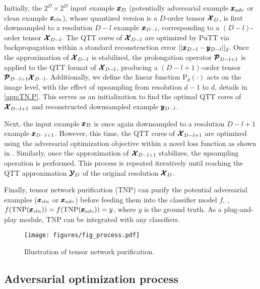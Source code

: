 Initially, the $2^D \times 2^D$ input example $\pmb{x}_D$ (potentially adversarial example $\pmb{x}_{adv}$ or clean example $\pmb{x}_{cln}$),
whose quantized version is a $D$-order tensor $\pmb{\mathcal{X}}_{D}$, is first downsampled to a resolution $D-l$ example
$\pmb{x}_{D-l}$,
corresponding to a $(D-l)$-order tensor $\pmb{\mathcal{X}}_{D-l}$.
The QTT cores of $\pmb{\mathcal{X}}_{D-l}$ are optimized by PuTT via backpropagation within a standard reconstruction error  $||\pmb{x}_{D-l}-\pmb{y}_{D-l}||_2$.
Once the approximation of $\pmb{\mathcal{X}}_{D-l}$ is stabilized,
the prolongation operator $\pmb{\mathcal{P}}_{D-l+1}$ is applied to
the QTT format of $\pmb{\mathcal{X}}_{D-l}$, producing a $(D-l+1)$-order tensor
$\pmb{\mathcal{P}}_{D-l+1}\pmb{\mathcal{X}}_{D-l}$.
Additionally, we define the linear function $\text{P}_d(\cdot)$ acts on the image level, with the effect of upsampling from resolution $d-1$ to $d$,
details in \cref{app:TN.P}.
This serves as an initialization to find the optimal QTT cores of $\pmb{\mathcal{X}}_{D-l+1}$ and reconstructed downsampled example $\pmb{y}_{D-l}$.


Next, the input example $\pmb{x}_D$ is once again downsampled to a resolution $D-l+1$ example $\pmb{x}_{D-l+1}$. However, this time, the QTT cores of $\pmb{\mathcal{X}}_{D-l+1}$ are optimized using the adversarial optimization objective within a novel loss function as shown in . Similarly, once the approximation of $\pmb{\mathcal{X}}_{D-l+1}$ stabilizes, the upsampling operation is performed. This process is repeated iteratively until reaching the QTT approximation $\pmb{\mathcal{Y}}_D$ of the original resolution $\pmb{\mathcal{X}}_{D}$.

Finally, tensor network purification (TNP) can purify the potential adversarial examples ($\pmb{x}_{cln}$ or $\pmb{x}_{adv}$) before feeding them into the classifier model $f$, \eg, $f(\text{TNP}(\pmb{x}_{cln}))=f(\text{TNP}(\pmb{x}_{adv}))=y$, where $y$ is the ground truth. As a plug-and-play module, TNP can be integrated with any classifiers.

\begin{figure}[t]
\vskip 0.1in
    \centering
    \texttt{[image: figures/fig\_process.pdf]}
    \caption{Illustration of tensor network purification.}
    \label{fig:process}
    \vskip -0.2in
\end{figure}


\subsection{Adversarial optimization process}
\label{Adversarial optimization process}

